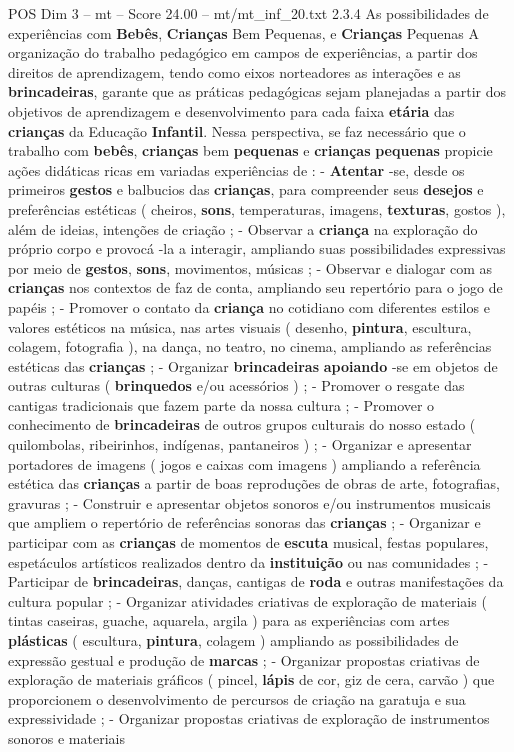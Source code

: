 \begin{textsample}{POS Dim 3 – mt – Score 24.00 – mt/mt\_inf\_20.txt}  \label{ex:f3_pos_079}
2.3.4 As possibilidades de experiências com \textbf{Bebês}, \textbf{Crianças} Bem Pequenas, e \textbf{Crianças} Pequenas A organização do trabalho pedagógico em campos de experiências, a partir dos direitos de aprendizagem, tendo como eixos norteadores as interações e as \textbf{brincadeiras}, garante que as práticas pedagógicas sejam planejadas a partir dos objetivos de aprendizagem e desenvolvimento para cada faixa \textbf{etária} das \textbf{crianças} da Educação \textbf{Infantil}.
Nessa perspectiva, se faz necessário que o trabalho com \textbf{bebês}, \textbf{crianças} bem \textbf{pequenas} e \textbf{crianças} \textbf{pequenas} propicie ações didáticas ricas em variadas experiências de : - \textbf{Atentar} -se, desde os primeiros \textbf{gestos} e balbucios das \textbf{crianças}, para compreender seus \textbf{desejos} e preferências estéticas ( cheiros, \textbf{sons}, temperaturas, imagens, \textbf{texturas}, gostos ), além de ideias, intenções de criação ; - Observar a \textbf{criança} na exploração do próprio corpo e provocá -la a interagir, ampliando suas possibilidades expressivas por meio de \textbf{gestos}, \textbf{sons}, movimentos, músicas ; - Observar e dialogar com as \textbf{crianças} nos contextos de faz de conta, ampliando seu repertório para o jogo de papéis ; - Promover o contato da \textbf{criança} no cotidiano com diferentes estilos e valores estéticos na música, nas artes visuais ( desenho, \textbf{pintura}, escultura, colagem, fotografia ), na dança, no teatro, no cinema, ampliando as referências estéticas das \textbf{crianças} ; - Organizar \textbf{brincadeiras} \textbf{apoiando} -se em objetos de outras culturas ( \textbf{brinquedos} e/ou acessórios ) ; - Promover o resgate das cantigas tradicionais que fazem parte da nossa cultura ; - Promover o conhecimento de \textbf{brincadeiras} de outros grupos culturais do nosso estado ( quilombolas, ribeirinhos, indígenas, pantaneiros ) ; - Organizar e apresentar portadores de imagens ( jogos e caixas com imagens ) ampliando a referência estética das \textbf{crianças} a partir de boas reproduções de obras de arte, fotografias, gravuras ; - Construir e apresentar objetos sonoros e/ou instrumentos musicais que ampliem o repertório de referências sonoras das \textbf{crianças} ; - Organizar e participar com as \textbf{crianças} de momentos de \textbf{escuta} musical, festas populares, espetáculos artísticos realizados dentro da \textbf{instituição} ou nas comunidades ; - Participar de \textbf{brincadeiras}, danças, cantigas de \textbf{roda} e outras manifestações da cultura popular ; - Organizar atividades criativas de exploração de materiais ( tintas caseiras, guache, aquarela, argila ) para as experiências com artes \textbf{plásticas} ( escultura, \textbf{pintura}, colagem ) ampliando as possibilidades de expressão gestual e produção de \textbf{marcas} ; - Organizar propostas criativas de exploração de materiais gráficos ( pincel, \textbf{lápis} de cor, giz de cera, carvão ) que proporcionem o desenvolvimento de percursos de criação na garatuja e sua expressividade ; - Organizar propostas criativas de exploração de instrumentos sonoros e materiais 
\end{textsample}

